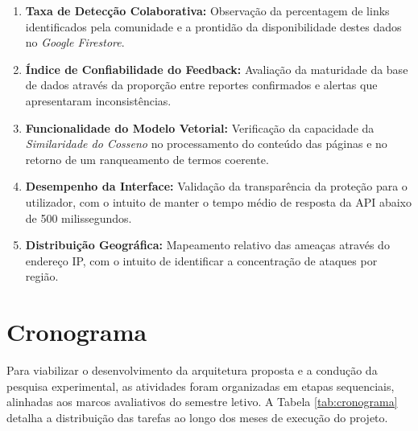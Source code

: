 \documentclass[a4paper,12pt]{article}
\begin{document}
\begin{enumerate}
    \item \textbf{Taxa de Detecção Colaborativa:} Observação da percentagem de links identificados pela comunidade e a prontidão da disponibilidade destes dados no \textit{Google Firestore}.
    \item \textbf{Índice de Confiabilidade do Feedback:} Avaliação da maturidade da base de dados através da proporção entre reportes confirmados e alertas que apresentaram inconsistências.
    \item \textbf{Funcionalidade do Modelo Vetorial:} Verificação da capacidade da \textit{Similaridade do Cosseno} no processamento do conteúdo das páginas e no retorno de um ranqueamento de termos coerente.
    \item \textbf{Desempenho da Interface:} Validação da transparência da proteção para o utilizador, com o intuito de manter o tempo médio de resposta da API abaixo de 500 milissegundos.
    \item \textbf{Distribuição Geográfica:} Mapeamento relativo das ameaças através do endereço IP, com o intuito de identificar a concentração de ataques por região.
\end{enumerate}

\section{Cronograma}
\label{sec:cronograma}

Para viabilizar o desenvolvimento da arquitetura proposta e a condução da pesquisa experimental, as atividades foram organizadas em etapas sequenciais, alinhadas aos marcos avaliativos do semestre letivo. A Tabela \ref{tab:cronograma} detalha a distribuição das tarefas ao longo dos meses de execução do projeto.
\end{document}
